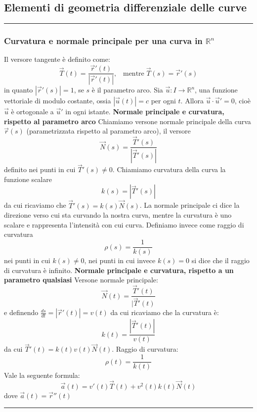 \subsection*{Elementi di geometria differenziale delle curve}
\rule{\textwidth}{0,4pt}
\subsubsection*{Curvatura e normale principale per una curva in $\mathbb{R}^n$}
Il versore tangente è definito come:
\[
    \vec{T}(t) = \frac{\vec{r}'(t)}{|\vec{r}'(t)|}\text{,} \quad \text{mentre} \;\vec{T}(s) =\vec{r}'(s)
\]
in quanto $|\vec{r}'(s)| = 1$, se $s$ è il parametro arco.\newline
Sia $\vec{u}: I \rightarrow \mathbb{R}^n$, una funzione vettoriale di modulo costante, ossia $|\vec{u}(t)| = c$ per ogni $t$. Allora $\vec{u} \cdot \vec{u}' = 0$, cioè $\vec{u}$ è ortogonale a $\vec{u}'$ in ogni istante.\newline
\newline
\textbf{Normale principale e curvatura, rispetto al parametro arco}\newline
Chiamiamo versone normale principale della curva $\vec{r}(s)$ (parametrizzata rispetto al parametro arco), il versore
\[
    \vec{N}(s) =\frac{\vec{T}'(s)}{|\vec{T}'(s)|}
\]
definito nei punti in cui $\vec{T}'(s) \neq 0$.\newline
Chiamiamo curvatura della curva la funzione scalare
\[
    k(s) = |\vec{T}'(s)|
\]
da cui ricaviamo che $\vec{T}'(s) = k(s) \vec{N}(s)$. \newline
La normale principale ci dice la direzione verso cui sta curvando la nostra curva, mentre la curvatura è uno scalare e rappresenta l'intensità con cui curva.\newline
Definiamo invece come raggio di curvatura
\[
    \rho(s) = \frac{1}{k(s)}
\]
nei punti in cui $k(s) \neq 0$, nei punti in cui invece $k(s) = 0$ si dice che il raggio di curvatura è infinito.\newline
\newline
\newline
\textbf{Normale principale e curvatura, rispetto a un parametro qualsiasi}\newline
Versone normale principale:
\[
    \vec{N}(t) =\frac{\vec{T}'(t)}{|\vec{T}'(t)}
\]
e definendo $\frac{ds}{dt} = |\vec{r}'(t)| = v(t)$ da cui ricaviamo che la curvatura è:
\[
    k(t) = \frac{|\vec{T}'(t)|}{v(t)}
\]
da cui $\vec{T}'(t) = k(t)v(t)\vec{N}(t)$.\newline
Raggio di curvatura:
\[
    \rho(t)= \frac{1}{k(t)}
\]
\newline
Vale la seguente formula:
\[
    \vec{a}(t) = v'(t)\vec{T}(t) + v^2(t) k(t) \vec{N}(t)
\]
dove $\vec{a}(t) = \vec{r}''(t)$\newline
\newline
\rule{\textwidth}{0,4pt}
